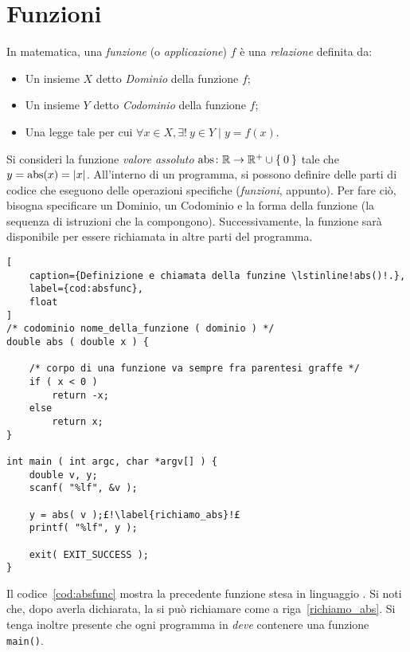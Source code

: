 	\section{Funzioni}
In matematica, una \emph{funzione} (o \emph{applicazione}) $f$ è una \emph{relazione} definita da:
\begin{itemize}
	\item
Un insieme $X$ detto \emph{Dominio} della funzione $f$;
	\item
Un insieme $Y$ detto \emph{Codominio} della funzione $f$;
	\item
Una legge tale per cui $\forall x \in X, \exists! \ y \in Y \mid y=f(x)$.
\end{itemize}

Si consideri la funzione \emph{valore assoluto} $\mathop{\mathrm{abs}}\colon\mathbb{R}\to\mathbb{R}^+\cup\Set{0}$ tale che $y = \mathop{\mathrm{abs}}(x)=\lvert x\rvert$.
All'interno di un programma, si possono definire delle parti di codice che eseguono delle operazioni specifiche (\emph{funzioni}, appunto).
Per fare ciò, bisogna specificare un Dominio, un Codominio e la forma della funzione (la sequenza di istruzioni che la compongono).
Successivamente, la funzione sarà disponibile per essere richiamata in altre parti del programma.


\begin{lstlisting}[
	caption={Definizione e chiamata della funzine \lstinline!abs()!.},
	label={cod:absfunc},
	float
]
/* codominio nome_della_funzione ( dominio ) */
double abs ( double x ) {

	/* corpo di una funzione va sempre fra parentesi graffe */
	if ( x < 0 )
		return -x;
	else
		return x;
}

int main ( int argc, char *argv[] ) {
	double v, y;
	scanf( "%lf", &v );

	y = abs( v );£!\label{richiamo_abs}!£
	printf( "%lf", y );

	exit( EXIT_SUCCESS );
}
\end{lstlisting}
Il codice~\ref{cod:absfunc} mostra la precedente funzione stesa in linguaggio .
Si noti che, dopo averla dichiarata, la si può richiamare come a riga~\ref{richiamo_abs}.
Si tenga inoltre presente che ogni programma in  \emph{deve} contenere una funzione \lstinline!main()!.


